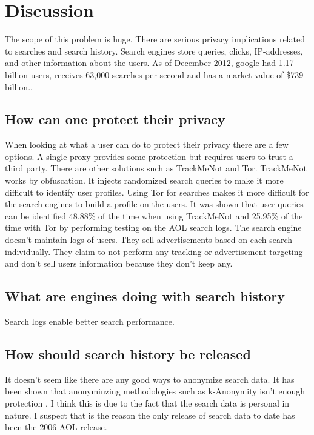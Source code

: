 \documentclass{article}
\begin{document}
\section{Discussion}
The scope of this problem is huge. There are serious privacy implications related to searches and search history. Search engines store queries, clicks, IP-addresses, and other information about the users. As of December 2012, google had 1.17 billion users\cite{google1}, receives 63,000 searches per second and has a market value of \$739 billion.\cite{google}.
\subsection{How can one protect their privacy}
When looking at what a user can do to protect their privacy there are a few options. A single proxy provides some protection but requires users to trust a third party. There are other solutions such as TrackMeNot and Tor. TrackMeNot works by obfuscation. It injects randomized search queries to make it more difficult to identify user profiles. Using Tor for searches makes it more difficult for the search engines to build a profile on the users. It was shown that user queries can be identified 48.88\% of the time when using TrackMeNot and 25.95\% of the time with Tor by performing testing on the AOL search logs\cite{TMN-Tor}. The search engine  doesn't maintain logs of users. They sell advertisements based on each search individually. They claim to not perform any tracking or advertisement targeting and don't sell users information because they don't keep any.

\subsection{What are engines doing with search history}
Search logs enable better search performance.

\subsection{How should search history be released}
It doesn't seem like there are any good ways to anonymize search data. It has been shown that anonyminzing methodologies such as k-Anonymity isn't enough protection \cite{publishing}. I think this is due to the fact that the search data is personal in nature. I suspect that is the reason the only release of search data to date has been the 2006 AOL release.
\end{document}
